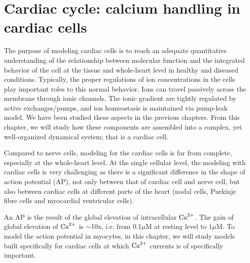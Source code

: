 \chapter{Cardiac cycle: calcium handling in cardiac cells}
\label{chap:calc-handl-card}
 

The purpose of modeling cardiac cells is to reach an adequate quantitative
understanding of the relationship between molecular function and the integrated
behavior of the cell at the tissue and whole-heart level in healthy and diseased
conditions. Typically, the proper regulations of ion concentrations in the
cells play important roles to this normal behavior.  Ions can travel passively across the
membrane through ionic channels.  The ionic gradient are tightly regulated by
active exchanges/pumps, and ion homeostasis is maintained via pump-leak model.
We have been studied these aspects in the previous chapters. From this chapter,
we will study how these components are assembled into a complex, yet
well-organized dynamical system; that is a cardiac cell.

Compared to nerve cells, modeling for the cardiac cells is far from complete,
especially at the whole-heart level. At the single cellular level, the modeling
with cardiac cells is very challenging as there is a significant difference in the
shape of action potential (AP), not only between that of cardiac cell and nerve
cell, but also between cardiac cells at different parts of the heart (nodal
cells, Purkinje fibre cells and myocardial ventricular cells).

\begin{framed}
  An AP is the result of the global elevation of intracellular ${\text{Ca}^{2+}}$.  The gain
  of global elevation of ${\text{Ca}^{2+}}$ is $\sim$10x, i.e. from 0.1$\mu$M at
  resting level to $1\mu$M.  To model the action potential in
  myocytes, in this chapter, we will study models built specifically
  for cardiac cells at which ${\text{Ca}^{2+}}$ currents is of specifically
  important.  %
\end{framed}


